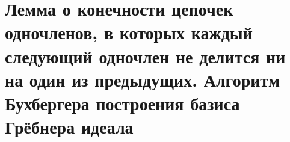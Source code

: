 \section{Лемма о конечности цепочек одночленов, в которых каждый следующий одночлен не делится ни на один из предыдущих. Алгоритм Бухбергера построения базиса Грёбнера идеала}